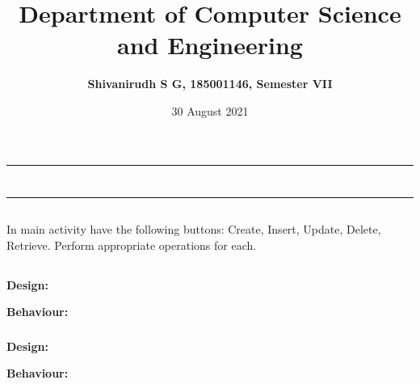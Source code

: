 \documentclass[12pt,letterpaper]{article}
\title{\textbf{Department of Computer Science and Engineering}}
\author{\textbf{Shivanirudh S G, 185001146, Semester VII }}
\date{30 August 2021}
\begin{document}
\maketitle
\hrule
\section*{}
\hrule 
\bigskip\bigskip

\subsection*{}

\subsection*{}
\begin{flushleft}
    In main activity have the following buttons: Create, Insert, Update, Delete, Retrieve. Perform appropriate operations for each.
\end{flushleft}

\subsection*{}
\subsubsection*{}
\textbf{Design:}
\begin{flushleft}

\end{flushleft}
\textbf{Behaviour:}
\begin{flushleft}

\end{flushleft}

\newpage
\subsubsection*{}
\textbf{Design:}
\begin{flushleft}

\end{flushleft}
\textbf{Behaviour:}
\begin{flushleft}

\end{flushleft}
\end{document}
